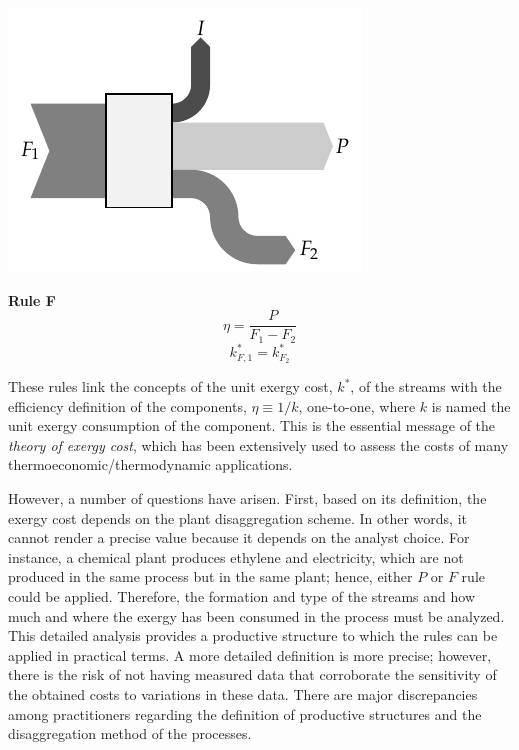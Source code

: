 \documentclass[energies,article,submit,moreauthors,pdftex]{Definitions/mdpi}
\begin{document}
\begin{center}
  \begin{minipage}[c]{0.50\linewidth}
    \includegraphics{reglaF.pdf}
  \end{minipage}
  \begin{minipage}[c]{0.45\linewidth}
    \centering
    \textbf{Rule F}
    \begin{equation*}
        \eta=\frac{P}{F_1-F_2}
    \end{equation*}
    \begin{equation*}
        k_{F,1}^*=k_{F_2}^*
    \end{equation*}
  \end{minipage}
  \label{fig:RulesFP}
\end{center}

These rules link  the concepts of the unit exergy cost, $k^*$, of the streams with the efficiency definition of the components, $\eta \equiv 1/k$, one-to-one, where $k$ is named the unit exergy consumption of the component. This is the essential message of the \emph{theory of exergy cost}, which has been extensively used to assess the costs of many thermoeconomic/thermodynamic applications.

However, a number of questions have arisen. First, based on its definition, the exergy cost depends on the plant disaggregation scheme. In other words, it cannot render a precise value because it depends on the analyst choice. For instance, a chemical plant produces ethylene and electricity, which are not produced in the same process but in the same plant; hence, either $P$ or $F$ rule could be applied. Therefore, the formation and type of the streams and how much and where the exergy has been consumed in the process must be analyzed. This detailed analysis provides a productive structure to which the rules can be applied in practical terms. A more detailed definition is more precise; however, there is the risk of not having measured data that corroborate the sensitivity of the obtained costs to variations in these data. There are major discrepancies among practitioners regarding the definition of productive structures and the disaggregation method of the processes.
\end{document}
